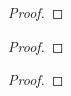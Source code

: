 \documentclass[lang=cn,newtx,10pt,scheme=chinese]{../Template/elegantbook}
\begin{document}
\begin{exercise}

\end{exercise}
\begin{proof}
    

\end{proof}

\begin{exercise}

\end{exercise}
\begin{proof}
    

\end{proof}

\begin{exercise}

\end{exercise}
\begin{proof}
    

\end{proof}
\end{document}
